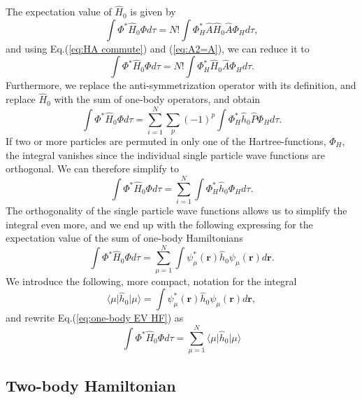 \documentclass[../main.tex]{subfiles}
\begin{document}
The expectation value of $\hat{H}_0$ is given by
\begin{equation}
    \int \Phi^* \hat{H}_0 \Phi d\tau = N! \int \Phi_H^* \hat{A} \hat{H}_0 \hat{A} \Phi_H d\tau,
\end{equation}
and using Eq.(\ref{eq:HA commute}) and (\ref{eq:A2=A}), we can reduce it to
\begin{equation}
    \int \Phi^* \hat{H}_0 \Phi d\tau = N! \int \Phi_H^* \hat{H}_0 \hat{A} \Phi_H d\tau.
\end{equation}
Furthermore, we replace the anti-symmetrization operator with its definition, and replace $\hat{H}_0$ with the sum of one-body operators, and obtain
\begin{equation}
    \int \Phi^* \hat{H}_0 \Phi d\tau = \sum_{i=1}^N \sum_p (-1)^p \int \Phi_H^* \hat{h}_0 \hat{P} \Phi_H d\tau.
\end{equation}
If two or more particles are permuted in only one of the Hartree-functions, $\Phi_H$, the integral vanishes since the individual single particle wave functions are orthogonal. We can therefore simplify to
\begin{equation}
    \int \Phi^* \hat{H}_0 \Phi d\tau = \sum_{i=1}^N \int \Phi_H^* \hat{h}_0 \Phi_H d\tau.
\end{equation}
The orthogonality of the single particle wave functions allows us to simplify the integral even more, and we end up with the following expressing for the expectation value of the sum of one-body Hamiltonians
\begin{equation}\label{eq:one-body EV HF}
    \int \Phi^* \hat{H}_0 \Phi d\tau = \sum_{\mu=1}^N \int \psi_\mu^*(\mathbf{r}) \hat{h}_0 \psi_\mu(\mathbf{r}) d\mathbf{r}.
\end{equation}
We introduce the following, more compact, notation for the integral
\begin{equation}
    \langle \mu \vert \hat{h}_0 \vert \mu \rangle = \int \psi_\mu^*(\mathbf{r}) \hat{h}_0 \psi_\mu(\mathbf{r}) d\mathbf{r},
\end{equation}
and rewrite Eq.(\ref{eq:one-body EV HF}) as 
\begin{equation}\label{eq:one-body EV HF 2}
    \int \Phi^* \hat{H}_0 \Phi d\tau = \sum_{\mu=1}^N \langle \mu \vert \hat{h}_0 \vert \mu \rangle
\end{equation}

\subsection{Two-body Hamiltonian}
\end{document}
